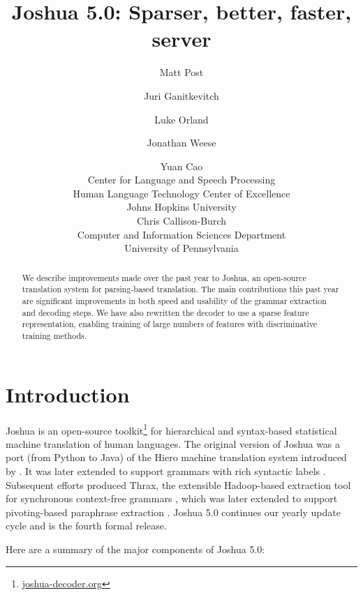 \documentclass[11pt]{article}
\title{Joshua 5.0: Sparser, better, faster, server}
\author{Matt Post\hltcoe 
  \and Juri Ganitkevitch\clsp 
  \and Luke Orland\hltcoe
  \and Jonathan Weese\clsp
  \and Yuan Cao\clsp  \\
  \clsp Center for Language and Speech Processing \\
  \hltcoe Human Language Technology Center of Excellence \\
  Johns Hopkins University \\
  \AND  Chris Callison-Burch \\
  Computer and Information Sciences Department \\
  University of Pennsylvania \\
}
\date{}
\begin{document}
\maketitle

\begin{abstract}
  We describe improvements made over the past year to Joshua, an
  open-source translation system for parsing-based translation. The
  main contributions this past year are significant improvements in
  both speed and usability of the grammar extraction and decoding
  steps. We have also rewritten the decoder to use a sparse feature
  representation, enabling training of large numbers of features with
  discriminative training methods.
\end{abstract}

\section{Introduction}
\label{sec-intro}

Joshua is an open-source toolkit\footnote{\url{joshua-decoder.org}}
for hierarchical and syntax-based statistical machine translation of
human languages.  The original version of Joshua \cite{Joshua-WMT} was
a port (from Python to Java) of the Hiero machine translation system
introduced by .  It was later extended to support
grammars with rich syntactic labels \cite{li2010joshua}. Subsequent
efforts produced Thrax, the extensible Hadoop-based extraction tool
for synchronous context-free grammars \cite{Joshua-3.0}, which was
later extended to support pivoting-based paraphrase extraction
\cite{Joshua-4.0}. Joshua 5.0 continues our yearly update cycle and is
the fourth formal release.

Here are a summary of the major components of Joshua 5.0:
\end{document}

